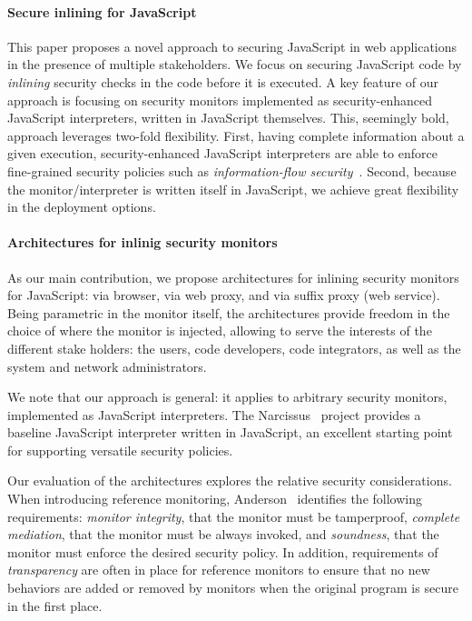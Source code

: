 \documentclass{llncs}
\begin{document}
\paragraph{Secure inlining for JavaScript}
This paper proposes a novel approach to securing JavaScript in web
applications in the presence of multiple stakeholders.
%
We focus on securing JavaScript code by \emph{inlining}
security checks in the code before it is executed.
%
A key feature
of our approach is focusing on security monitors implemented as
security-enhanced JavaScript interpreters, written in JavaScript
themselves. This, seemingly bold, approach leverages two-fold
flexibility. First, having complete information about a given
execution, security-enhanced JavaScript interpreters are able to
enforce fine-grained security policies such as \emph{information-flow
security}~\cite{Sabelfeld:Myers:JSAC}. Second, because the monitor/interpreter is written itself in
JavaScript, we achieve great flexibility in the deployment options.

\paragraph{Architectures for inlinig security monitors}
As our main contribution,
we propose architectures for inlining security monitors for JavaScript: via
browser, via web proxy, and via suffix proxy (web service). 
%
Being parametric in the monitor itself,
the architectures provide freedom in the choice of where the monitor is
injected, allowing to serve the interests of the different stake
holders: the users, code developers, code
integrators, as well as the system and network administrators.

We note that our approach is general: it applies to arbitrary security
monitors, implemented as JavaScript interpreters. The 
 Narcissus~\cite{Narcissus} project provides a baseline JavaScript
 interpreter written in JavaScript, an excellent starting
 point for supporting versatile security policies.

Our evaluation of the architectures explores the relative security considerations.
When introducing reference monitoring, Anderson~\cite{Anderson:72}
identifies the following requirements:
\emph{monitor integrity}, that the monitor must be tamperproof,
\emph{complete mediation}, that the monitor must be always invoked, and
\emph{soundness}, that the monitor must enforce the desired security policy.
In addition, requirements of 
\emph{transparency} are often in place for reference monitors to
ensure that no new behaviors are added or removed by monitors when the
original program is secure in the first place.
\end{document}
